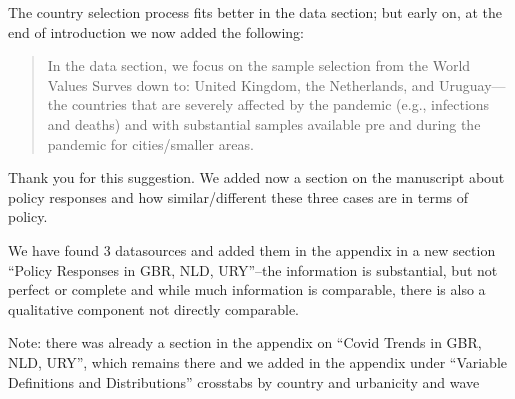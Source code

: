 The country selection process fits better in the data section; but early on, at the end of introduction we now added the following:\\

\begin{quote}
  In the data section, we focus on the sample selection from the World Values Surves down to: United Kingdom, the Netherlands, and Uruguay---the countries that are severely affected by the pandemic (e.g., infections and deaths) and with substantial samples available pre and during the pandemic for cities/smaller areas.
\end{quote}


Thank you for this suggestion. We added now a section on the manuscript about policy responses and how similar/different these three cases are in terms of policy. 

We have found 3 datasources and added them in the appendix in a new section ``Policy Responses in GBR, NLD,
URY''--the information is substantial, but not perfect or complete and while much information is comparable, there is also a qualitative component not directly comparable. %

Note: there was already a section in the appendix on ``Covid Trends in GBR, NLD, URY'', which remains there and we added in the appendix under ``Variable Definitions and Distributions'' crosstabs by country and urbanicity and wave\\






